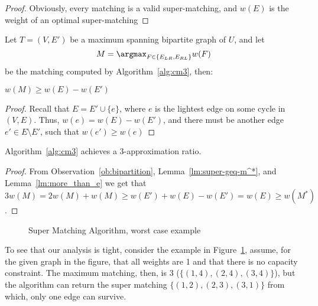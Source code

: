 \begin{proof}
Obviously, every matching is a valid super-matching, 
and $w(E)$ is the weight of an optimal super-matching 
\end{proof}

Let $T = (V, E')$ be a maximum spanning bipartite graph of $U$,
and let 
$$M = \argmax_{F \in \{ E_{LR}, E_{RL} \}}{w(F)}$$
be the matching computed by Algorithm~\ref{alg:cm3}, then:

\begin{lemma}
\label{lm:more_than_e}
$w(M) \geq w(E) - w(E')$
\end{lemma}

\begin{proof}
Recall that $E = E' \cup \{e\}$, 
where $e$ is the lightest edge on some cycle in $(V, E)$. 
Thus, $w(e) = w(E) - w(E')$, 
and there must be another edge $e' \in E \setminus E'$, 
such that $w(e') \geq w(e)$
\end{proof}

\begin{theorem}
Algorithm~\ref{alg:cm3} achieves a 3-approximation ratio.
\end{theorem}

\begin{proof}
From Observation~\ref{ob:bipartition}, Lemma~\ref{lm:super-geq-m^*},
and Lemma~\ref{lm:more_than_e} we get that
$$3w(M) = 2w(M) + w(M) \geq w(E') + w(E) - w(E') = w(E) \geq w(M^*)$$.
\end{proof}

\begin{figure}
\centering

\caption{
\label{fig:3cm-tight-fig}
Super Matching Algorithm, worst case example
}
\end{figure}

To see that our analysis is tight, consider the example in Figure~\ref{fig:3cm-tight-fig},
assume, for the given graph in the figure, 
that all weights are 1 and that there is no capacity constraint.
The maximum matching, then, is 3 ($\{(1,4), (2,4), (3,4)\}$), 
but the algorithm can return the super matching $\{(1,2), (2,3), (3,1)\}$ from which, 
only one edge can survive.  